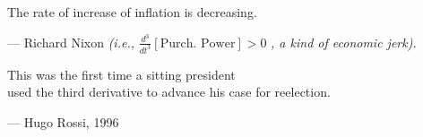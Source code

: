 \begin{flushright}
\begin{hangleftquote}{\QENOpen}{\QENClose}
The rate of increase of inflation is decreasing.
\end{hangleftquote}
\par\smallskip
\normalfont — Richard Nixon \textit{(i.e., } $\frac{d^3}{dt^3}[\text{Purch. Power}] > 0$ \textit{, a kind of economic jerk).}
\end{flushright}

\vspace{2em}

\begin{flushright}
\begin{hangleftquote}{\QENOpen}{\QENClose}
This was the first time a sitting president\\
used the third derivative to advance his case for reelection.
\end{hangleftquote}
\par\smallskip
\normalfont — Hugo Rossi, 1996
\end{flushright}
